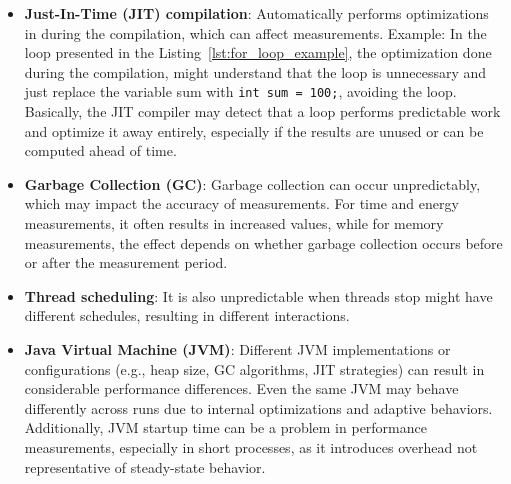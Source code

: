 \begin{itemize}
    \item \textbf{Just-In-Time (JIT) compilation}: Automatically performs optimizations in during the compilation, which can affect measurements. Example: In the loop presented in the Listing~\ref{lst:for_loop_example}, the optimization done during the compilation, might understand that the loop is unnecessary and just replace the variable sum with \texttt{int sum = 100;}, avoiding the loop. Basically, the JIT compiler may detect that a loop performs predictable work and optimize it away entirely, especially if the results are unused or can be computed ahead of time.
    
    \item \textbf{Garbage Collection (GC)}: Garbage collection can occur unpredictably, which may impact the accuracy of measurements. For time and energy measurements, it often results in increased values, while for memory measurements, the effect depends on whether garbage collection occurs before or after the measurement period.
    
    \item \textbf{Thread scheduling}: It is also unpredictable when threads stop might have different schedules, resulting in different interactions.
    
    \item \textbf{Java Virtual Machine (JVM)}: Different JVM implementations or configurations (e.g., heap size, GC algorithms, JIT strategies) can result in considerable performance differences. Even the same JVM may behave differently across runs due to internal optimizations and adaptive behaviors. Additionally, JVM startup time can be a problem in performance measurements, especially in short processes, as it introduces overhead not representative of steady-state behavior.

\end{itemize}

